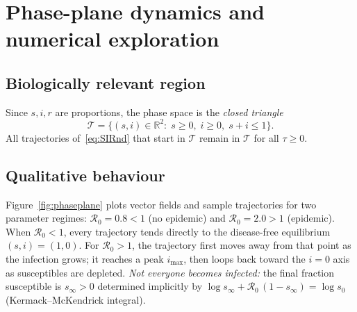 \documentclass[11pt]{article}
\newcommand{\R}{\mathbb{R}}
\newcommand{\RR}{\mathcal{R}_0}
\begin{document}
\section{Phase-plane dynamics and numerical exploration}
\label{sec:PhasePlane}

\subsection*{Biologically relevant region}
Since $s,i,r$ are proportions, the phase space is the
\emph{closed triangle}
\[
\mathcal T=\{(s,i)\in\R^2:\; s\ge0,\; i\ge0,\; s+i\le1\}.
\]
All trajectories of~\cref{eq:SIRnd} that start in $\mathcal T$
remain in $\mathcal T$ for all $\tau\ge0$.

\subsection*{Qualitative behaviour}
Figure~\cref{fig:phaseplane} plots vector fields and sample trajectories
for two parameter regimes:
$\RR=0.8<1$ (no epidemic) and $\RR=2.0>1$ (epidemic).
When $\RR<1$, every trajectory tends directly to the
disease-free equilibrium $(s,i)=(1,0)$.
For $\RR>1$, the trajectory first moves away from that point
as the infection grows; it reaches a peak $i_{\max}$, then
loops back toward the $i=0$ axis as susceptibles are depleted.
\emph{Not everyone becomes infected:} the final fraction susceptible
is $s_{\infty}>0$ determined implicitly by
\(\log s_{\infty} + \RR\,(1-s_{\infty})=\log s_{0}\)
(Kermack–McKendrick integral).

\end{document}
